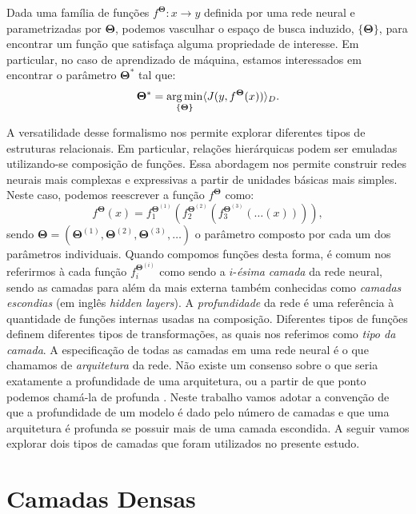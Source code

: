Dada uma família de funções $f^{\mathbf{\Theta}} : x \rightarrow y$ definida por uma rede neural e parametrizadas por $\mathbf{\Theta}$, podemos vasculhar o espaço de busca induzido, $\{\mathbf{\Theta}\}$, para encontrar um função que satisfaça alguma propriedade de interesse. Em particular, no caso de aprendizado de máquina, estamos interessados em encontrar o parâmetro $\mathbf{\Theta}^*$ tal que:
\begin{equation}\label{thetaotimo}
\mathbf{\Theta}^* = \operatorname*{arg\,min}_{\{\mathbf{\Theta}\}} \langle J(y, f^{\mathbf{\Theta}}(x)) \rangle_{D}.
\end{equation} 

A versatilidade desse formalismo nos permite explorar diferentes tipos de estruturas relacionais. Em particular, relações hierárquicas podem ser emuladas utilizando-se composição de funções. Essa abordagem nos permite construir redes neurais mais complexas e expressivas a partir de unidades básicas mais simples. Neste caso, podemos reescrever a função $f^{\mathbf{\Theta}}$ como:
\begin{equation}\label{fcamadas}
f^{\mathbf{\Theta}}(x) = f_1^{\mathbf{\Theta}^{(1)}}(f_2^{\mathbf{\Theta}^{(2)}} (f_3^{\mathbf{\Theta}^{(3)}}(\ldots(x))) ),
\end{equation}
sendo $\mathbf{\Theta} = (\mathbf{\Theta}^{(1)}, \mathbf{\Theta}^{(2)}, \mathbf{\Theta}^{(3)}, \ldots)$ o parâmetro composto por cada um dos parâmetros individuais.
Quando compomos funções desta forma, é comum nos referirmos à cada função $f_i^{\mathbf{\Theta}^{(i)}}$ como sendo a $i$-\textit{ésima} \textit{camada} da rede neural, sendo as camadas para além da mais externa também conhecidas como \textit{camadas escondias} (em inglês \textit{hidden layers}). A \textit{profundidade} da rede é uma referência à quantidade de funções internas usadas na composição. Diferentes tipos de funções definem diferentes tipos de transformações, as quais nos referimos como \textit{tipo da camada}. A especificação de todas as camadas em uma rede neural é o que chamamos de \textit{arquitetura} da rede. Não existe um consenso sobre o que seria exatamente a profundidade de uma arquitetura, ou a partir de que ponto podemos chamá-la de profunda \cite{Goodfellow-et-al-2016}. Neste trabalho vamos adotar a convenção de que a profundidade de um modelo é dado pelo número de camadas e que uma arquitetura é profunda se possuir mais de uma camada escondida. A seguir vamos explorar dois tipos de camadas que foram utilizados no presente estudo.

\section{Camadas Densas}


